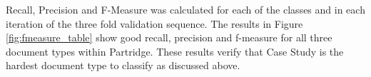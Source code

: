 Recall, Precision and F-Measure was calculated for each of the classes and in
each iteration of the three fold validation sequence. The results in Figure
\ref{fig:fmeasure_table} show good recall, precision and f-measure for all
three document types within Partridge. These results verify that Case Study is
the hardest document type to classify as discussed above.


